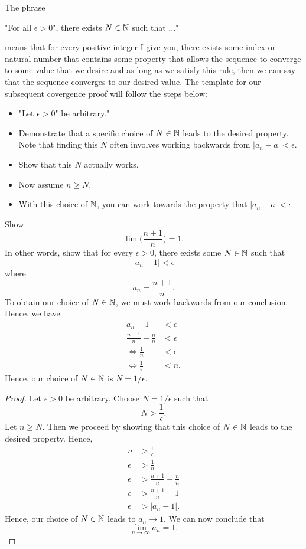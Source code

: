 The phrase 

\begin{center}
"For all \( \epsilon> 0 \)", there exists \( N \in \mathbb{N} \) such that ..."
\end{center}

means that for every positive integer I give you, there exists some index or natural number that contains some property that allows the sequence to converge to some value that we desire and as long as we satisfy this rule, then we can say that the sequence converges to our desired value. The template for our subsequent covergence proof will follow the steps below:

\begin{itemize}
    \item "Let \( \epsilon> 0 \)" be arbitrary."
    \item Demonstrate that a specific choice of \( N \in \mathbb{N} \) leads to the desired property. Note that finding this \( N \) often involves working backwards from \( |a_n - a | < \epsilon \). 
    \item Show that this \( N \) actually works.
    \item Now assume \( n \geq N \). 
    \item With this choice of \( \mathbb{N} \), you can work towards the property that \( |a_n - a | < \epsilon \)
\end{itemize}

Show 
\[ \lim \Big( \frac{n+1}{n}\Big) = 1.\]
In other words, show that for every \( \epsilon  > 0 \), there exists some \( N \in \mathbb{N} \) such that 
\[ |a_n - 1| < \epsilon \] where 
\[ a_n = \frac{n+1}{n}. \]
To obtain our choice of \( N \in \mathbb{N} \), we must work backwards from our conclusion. Hence, we have 
\begin{align*}
a_n - 1 &< \epsilon  \\
\frac{n+1}{n} - \frac{n}{n} &< \epsilon \\ 
\iff \frac{1}{n} &<  \epsilon \\
\iff \frac{1}{ \epsilon } &< n.
\end{align*}
Hence, our choice of \( N \in \mathbb{N} \) is \( N = 1/ \epsilon \). 
%


\begin{proof}
Let \( \epsilon  > 0 \) be arbitrary. Choose \( N = 1 / \epsilon  \) such that 
\[ N > \frac{1}{ \epsilon }.\]
Let \( n \geq N \). Then we proceed by showing that this choice of \( N \in \mathbb{N} \) leads to the desired property. 
Hence, 
\begin{align*}
n &> \frac{1}{ \epsilon } \\
\epsilon &> \frac{1}{ n } \\
\epsilon  &> \frac{ n+1 }{n} - \frac{n}{n} \\ 
\epsilon &> \frac{n+1}{n} - 1 \\
\epsilon  &> |a_n - 1|.
\end{align*}
Hence, our choice of \( N \in \mathbb{N} \) leads to \( a_n \to 1 \). We can now conclude that 
\[ \lim_{n \to \infty} a_n = 1.\]
\end{proof}

